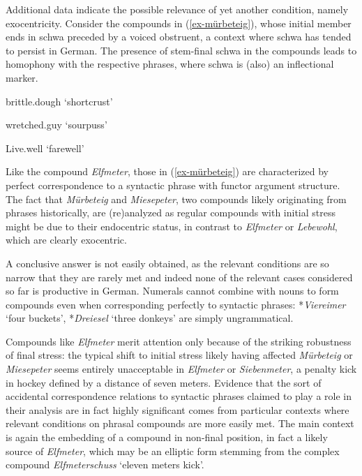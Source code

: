 \documentclass[output=paper
 ,nobabel
 ,draftmode
 ,colorlinks, citecolor=brown
]{langscibook}
\begin{document}
Additional data indicate the possible relevance of yet another condition, namely
exocentricity. Consider the compounds in (\ref{ex-mürbeteig}), whose initial member ends in schwa
preceded by a voiced obstruent, a context where schwa has tended to persist in German. The presence
of stem-final schwa in the compounds leads to homophony with the respective phrases, where schwa is
(also) an inflectional marker.


\eal\label{ex-mürbeteig}
 

brittle.dough   
`shortcrust' 

 

wretched.guy     
`sourpuss' 

 

Live.well      
`farewell' 

\zl

\noindent
Like the compound \emph{Elfmeter}, those in (\ref{ex-mürbeteig}) are characterized by perfect
correspondence to a syntactic phrase with functor argument structure. The fact that \emph{Mürbeteig}
and \emph{Miesepeter}, two compounds likely originating from phrases historically, are (re)analyzed
as regular compounds with initial stress might be due to their endocentric status, in contrast to
\emph{Elfmeter} or \emph{Lebewohl}, which are clearly exocentric. 

A conclusive answer is not easily obtained, as the relevant conditions are so narrow that they are
rarely met and indeed none of the relevant cases considered so far is productive in German. Numerals
cannot combine with nouns to form compounds even when corresponding perfectly to syntactic phrases:
*\emph{Viereimer} `four buckets', *\emph{Dreiesel} `three donkeys' are simply ungrammatical.  

Compounds like \emph{Elfmeter} merit attention only because of the striking robustness of final
stress: the typical shift to initial stress likely having affected \emph{Mürbeteig} or
\emph{Miesepeter} seems entirely unacceptable in \emph{Elfmeter} or \emph{Siebenmeter}, a penalty
kick in hockey defined by a distance of seven meters. Evidence that the sort of accidental
correspondence relations to syntactic phrases claimed to play a role in their analysis are in fact
highly significant comes from particular contexts where relevant conditions on phrasal compounds are
more easily met. The main context is again the embedding of a compound in non-final position, in
fact a likely source of \emph{Elfmeter}, which may be an elliptic form stemming from the complex
compound \emph{Elfmeterschuss} `eleven meters kick'.  
\end{document}
